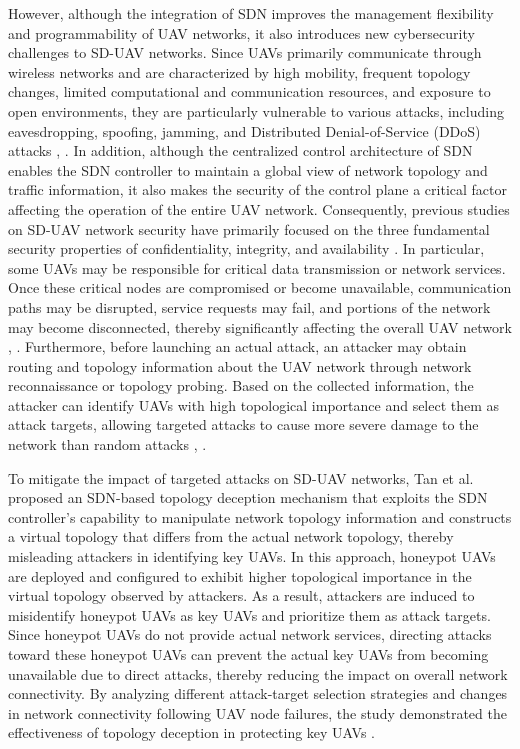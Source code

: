 \begin{ZhChapter}
However, although the integration of SDN improves the management flexibility and programmability of UAV networks, it also introduces new cybersecurity challenges to SD-UAV networks. Since UAVs primarily communicate through wireless networks and are characterized by high mobility, frequent topology changes, limited computational and communication resources, and exposure to open environments, they are particularly vulnerable to various attacks, including eavesdropping, spoofing, jamming, and Distributed Denial-of-Service (DDoS) attacks \cite{abir:2023}, \cite{ouldrabah:2024}. In addition, although the centralized control architecture of SDN enables the SDN controller to maintain a global view of network topology and traffic information, it also makes the security of the control plane a critical factor affecting the operation of the entire UAV network. Consequently, previous studies on SD-UAV network security have primarily focused on the three fundamental security properties of confidentiality, integrity, and availability \cite{tan:2022}. In particular, some UAVs may be responsible for critical data transmission or network services. Once these critical nodes are compromised or become unavailable, communication paths may be disrupted, service requests may fail, and portions of the network may become disconnected, thereby significantly affecting the overall UAV network \cite{tan:2022}, \cite{ouldrabah:2024}. Furthermore, before launching an actual attack, an attacker may obtain routing and topology information about the UAV network through network reconnaissance or topology probing. Based on the collected information, the attacker can identify UAVs with high topological importance and select them as attack targets, allowing targeted attacks to cause more severe damage to the network than random attacks \cite{tan:2022}, \cite{hashan:2026}.

To mitigate the impact of targeted attacks on SD-UAV networks, Tan et al. \cite{tan:2022} proposed an SDN-based topology deception mechanism that exploits the SDN controller's capability to manipulate network topology information and constructs a virtual topology that differs from the actual network topology, thereby misleading attackers in identifying key UAVs. In this approach, honeypot UAVs are deployed and configured to exhibit higher topological importance in the virtual topology observed by attackers. As a result, attackers are induced to misidentify honeypot UAVs as key UAVs and prioritize them as attack targets. Since honeypot UAVs do not provide actual network services, directing attacks toward these honeypot UAVs can prevent the actual key UAVs from becoming unavailable due to direct attacks, thereby reducing the impact on overall network connectivity. By analyzing different attack-target selection strategies and changes in network connectivity following UAV node failures, the study demonstrated the effectiveness of topology deception in protecting key UAVs \cite{tan:2022}.


\end{ZhChapter}
